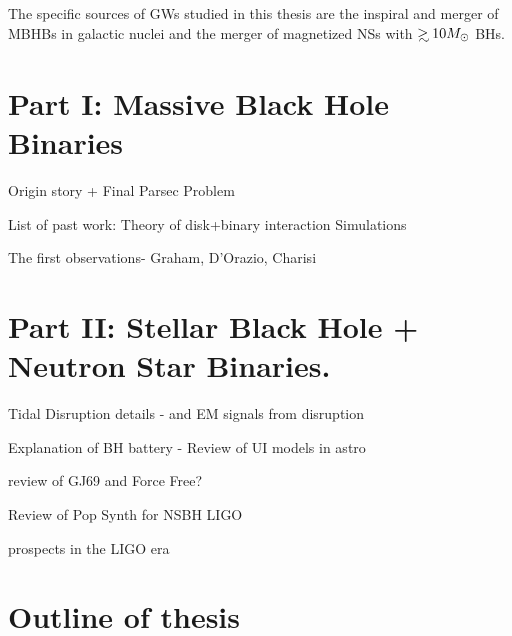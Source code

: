 The specific sources of GWs studied in this thesis are the inspiral and merger of MBHBs in galactic nuclei and the merger of magnetized NSs with $\gsim 10 \Msun$ BHs.
\section{Part I: Massive Black Hole Binaries}
Origin story + Final Parsec Problem

List of past work:
Theory of disk+binary interaction
Simulations

The first observations- Graham, D'Orazio, Charisi



\section{Part II: Stellar Black Hole + Neutron Star Binaries.}

Tidal Disruption details - and EM signals from disruption

Explanation of BH battery - Review of UI models in astro

review of GJ69 and Force Free?

Review of Pop Synth for NSBH LIGO


prospects in the LIGO era









\section{Outline of thesis}























